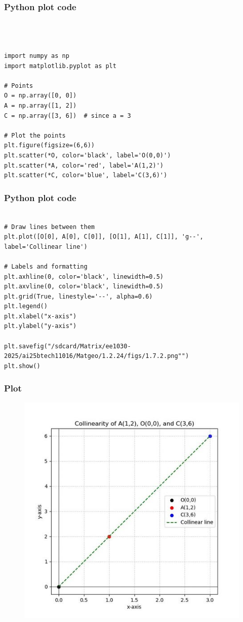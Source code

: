 \documentclass{beamer}
\begin{document}
\begin{frame}[fragile]
    \frametitle{Python plot code}
    \begin{lstlisting}



import numpy as np
import matplotlib.pyplot as plt

# Points
O = np.array([0, 0])
A = np.array([1, 2])
C = np.array([3, 6])  # since a = 3

# Plot the points
plt.figure(figsize=(6,6))
plt.scatter(*O, color='black', label='O(0,0)')
plt.scatter(*A, color='red', label='A(1,2)')
plt.scatter(*C, color='blue', label='C(3,6)')
\end{lstlisting}
\end{frame}
\begin{frame}[fragile]
    \frametitle{Python plot code}
    \begin{lstlisting}

# Draw lines between them
plt.plot([O[0], A[0], C[0]], [O[1], A[1], C[1]], 'g--', label='Collinear line')

# Labels and formatting
plt.axhline(0, color='black', linewidth=0.5)
plt.axvline(0, color='black', linewidth=0.5)
plt.grid(True, linestyle='--', alpha=0.6)
plt.legend()
plt.xlabel("x-axis")
plt.ylabel("y-axis")

plt.savefig("/sdcard/Matrix/ee1030-2025/ai25btech11016/Matgeo/1.2.24/figs/1.7.2.png"")
plt.show()
\end{lstlisting}
\end{frame}
\begin{frame}[fragile]
    \frametitle{Plot}
    


\begin{figure}[H]
    \centering
    \includegraphics[scale=0.4]{figs/1.7.2.jpg}
    \caption{}
    \label{fig:1}
\end{figure}
    

 \end{frame}
\end{document}
